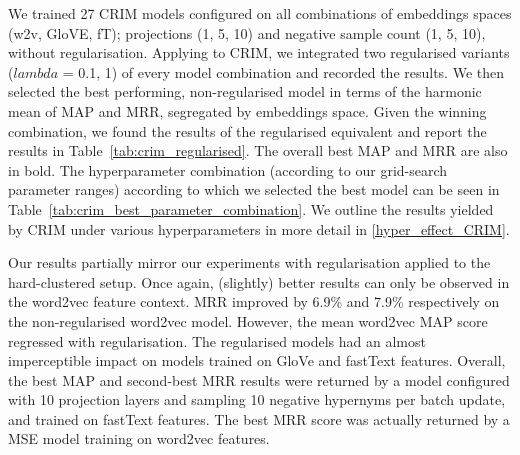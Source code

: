 We trained 27 CRIM models configured on all combinations of embeddings spaces (w2v, GloVE, fT); projections (1, 5, 10) and negative sample count (1, 5, 10), without regularisation.  Applying \citep{ustalov2017negative} to CRIM, we integrated two regularised variants ($lambda$ = 0.1, 1) of every model combination and recorded the results.  We then selected the best performing, non-regularised model in terms of the harmonic mean of \ac{MAP} and \ac{MRR}, segregated by embeddings space.  Given the winning combination, we found the results of the regularised equivalent and report the results in Table~\ref{tab:crim_regularised}.  The overall best \ac{MAP} and \ac{MRR} are also in bold.  The hyperparameter combination (according to our grid-search parameter ranges) according to which we selected the best model can be seen in Table~\ref{tab:crim_best_parameter_combination}.  We outline the results yielded by CRIM under various hyperparameters in more detail in \cref{hyper_effect_CRIM}.

Our results partially mirror our experiments with regularisation applied to the hard-clustered setup.  Once again, (slightly) better results can only be observed in the word2vec feature context.  \ac{MRR} improved by 6.9\% and 7.9\% respectively on the non-regularised word2vec model.  However, the mean word2vec \ac{MAP} score regressed with regularisation.  The regularised models had an almost imperceptible impact on models trained on GloVe and fastText features.  Overall, the best \ac{MAP} and second-best \ac{MRR} results were returned by a model configured with 10 projection layers and sampling 10 negative hypernyms per batch update, and trained on fastText features.  The best \ac{MRR} score was actually returned by a \ac{MSE} model training on word2vec features.

